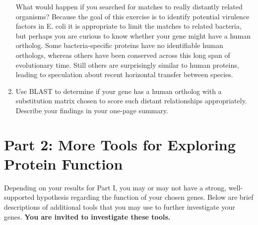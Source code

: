 \begin{enumerate}
What would happen if you searched for matches to really distantly related organisms?  Because the goal of this exercise is to identify potential virulence factors in E. coli it is appropriate to limit the matches to related bacteria, but perhaps you are curious to know whether your gene might have a human ortholog. Some bacteria-specific proteins have no identifiable human orthologs, whereas others have been conserved across this long span of evolutionary time.  Still others are surprisingly similar to human proteins, leading to speculation about recent horizontal transfer between species.  

	\item Use BLAST to determine if your gene has a human ortholog with a substitution matrix chosen to score such distant relationships appropriately.  Describe your findings in your one-page summary.

\end{enumerate}

\vspace*{-.1in}
\section*{Part 2: More Tools for Exploring Protein Function}
\vspace*{-.1in} 

Depending on your results for Part I, you may or may not have a strong, well-supported hypothesis regarding the function of your chosen genes.  Below are brief descriptions of additional tools that you may use to further investigate your genes. \textbf{You are invited to investigate these tools.}\\

